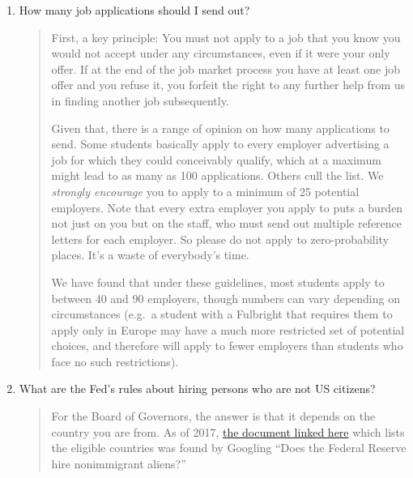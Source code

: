 \documentclass{\classes/econtex}
\providecommand\phantomsection{}
\begin{document}
\begin{enumerate}
\begin{quote}
  \end{quote}
\item  {} 
  How many job applications should I send out?

  \begin{quote}
    First, a key principle: You must not apply to a job that you know you would not
    accept under any circumstances, even if it were your only offer.  If
    at the end of the job market process you have at least one job offer
    and you refuse it, you forfeit the right to any further help from us
    in finding another job subsequently.  %

    Given that, there is a range of opinion on how many applications to send.  Some students basically apply to every employer advertising a job for which they could conceivably qualify, which at a maximum might lead to as many as 100 applications.  Others cull the list.  We \textit{strongly encourage} you to apply to a minimum of 25 potential employers.  Note that every extra employer you apply to puts a burden not just on you but on the staff, who must send out multiple reference letters for each employer.  So please do not apply to zero-probability places.  It's a waste of everybody's time.

    We have found that under these guidelines, most students apply to between 
    40 and 90 employers, though numbers can vary depending on circumstances 
    (e.g.\ a student with a Fulbright that requires them to apply only in 
    Europe may have a much more restricted set of potential choices,
    and therefore will apply to fewer employers than students who face
    no such restrictions).


    \ifdvi\phantomsection\hypertarget{FedHiringRules}{}\fi

  \end{quote}
\item  {}  What are the Fed's rules about hiring persons who are not US citizens? 

  \begin{quote}
    For the Board of Governors, the answer is that it depends on the country you are from.  As of 2017, \href{https://www.federalreserve.gov/boarddocs/srletters/2006/SR0614a3.pdf}{the document linked here} which lists the eligible countries was found by Googling ``Does the Federal Reserve hire nonimmigrant aliens?'' 


\end{quote}
\end{enumerate}
\end{document}
